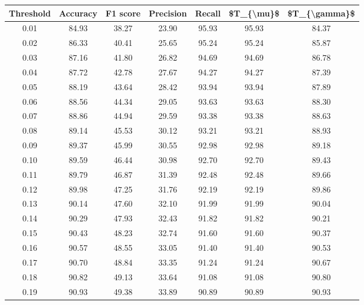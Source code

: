 \begin{tabular}{|c|c|c|c|c|c|c|}
\hline
 Threshold &  Accuracy &  F1 score &  Precision &  Recall &  \$T\_\{\textbackslash mu\}\$ &  \$T\_\{\textbackslash gamma\}\$ \\
\hline
      0.01 &     84.93 &     38.27 &      23.90 &   95.93 &      95.93 &         84.37 \\
      0.02 &     86.33 &     40.41 &      25.65 &   95.24 &      95.24 &         85.87 \\
      0.03 &     87.16 &     41.80 &      26.82 &   94.69 &      94.69 &         86.78 \\
      0.04 &     87.72 &     42.78 &      27.67 &   94.27 &      94.27 &         87.39 \\
      0.05 &     88.19 &     43.64 &      28.42 &   93.94 &      93.94 &         87.89 \\
      0.06 &     88.56 &     44.34 &      29.05 &   93.63 &      93.63 &         88.30 \\
      0.07 &     88.86 &     44.94 &      29.59 &   93.38 &      93.38 &         88.63 \\
      0.08 &     89.14 &     45.53 &      30.12 &   93.21 &      93.21 &         88.93 \\
      0.09 &     89.37 &     45.99 &      30.55 &   92.98 &      92.98 &         89.18 \\
      0.10 &     89.59 &     46.44 &      30.98 &   92.70 &      92.70 &         89.43 \\
      0.11 &     89.79 &     46.87 &      31.39 &   92.48 &      92.48 &         89.66 \\
      0.12 &     89.98 &     47.25 &      31.76 &   92.19 &      92.19 &         89.86 \\
      0.13 &     90.14 &     47.60 &      32.10 &   91.99 &      91.99 &         90.04 \\
      0.14 &     90.29 &     47.93 &      32.43 &   91.82 &      91.82 &         90.21 \\
      0.15 &     90.43 &     48.23 &      32.74 &   91.60 &      91.60 &         90.37 \\
      0.16 &     90.57 &     48.55 &      33.05 &   91.40 &      91.40 &         90.53 \\
      0.17 &     90.70 &     48.84 &      33.35 &   91.24 &      91.24 &         90.67 \\
      0.18 &     90.82 &     49.13 &      33.64 &   91.08 &      91.08 &         90.80 \\
      0.19 &     90.93 &     49.38 &      33.89 &   90.89 &      90.89 &         90.93 \\

\end{tabular}
